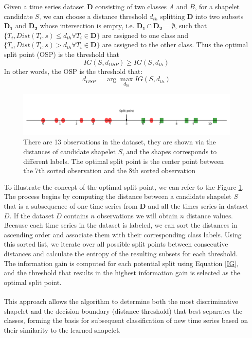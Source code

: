 \begin{definition}
Given a time series dataset $\boldsymbol{D}$ consisting of two classes $A$ and $B$, for a shapelet candidate $S$, we can choose a distance threshold $d_{th}$ splitting $\boldsymbol{D}$ into two subsets $\boldsymbol{D_1}$ and $\boldsymbol{D_2}$ whose intersection is empty, i.e. $\boldsymbol{D_1} \cap \boldsymbol{D_2}=\emptyset$, such that $\{T_i, Dist(T_i,s)\leq d_{th} \forall T_i \in \boldsymbol{D} \}$ are assigned to one class and $\{T_i, Dist(T_i,s) > d_{th} \forall T_i \in \boldsymbol{D} \}$ are assigned to the other class. Thus the optimal split point (OSP) is the threshold that 
$$
	IG(S, d_{OSP}) \geq IG(S, d_{th})
$$
In other words, the OSP is the threshold that:\\
$$
	d_{OSP}=\arg \max_{d_{th}} IG (S,d_{th})
$$
\label{def:OSP}
\end{definition}

\begin{figure}[h!]
	\centering
	\includegraphics[width=0.9\linewidth]{../Statistical_Sciences_template/figure/OSP.png}
	\caption{There are 13 observations in the dataset, they are shown via the distances of candidate shapelet $S$, and the shapes corresponds to different labels. The optimal split point is the center point between the 7th sorted observation and the 8th sorted observation}
	\label{fig:OSP}
\end{figure}

\noindent To illustrate the concept of the optimal split point, we can refer to the Figure \ref{fig:OSP}. The process begins by computing the distance between a candidate shapelet $S$ that is a subsequence of one time series from $\boldsymbol{D}$ and all the times series in dataset $D$. If the dataset $D$ contains $n$ observations we will obtain $n$ distance values. Because each time series in the dataset is labeled, we can sort the distances in ascending order and associate them with their corresponding class labels. Using this sorted list, we iterate over all possible split points between consecutive distances and calculate the entropy of the resulting subsets for each threshold. The information gain is computed for each potential split using Equation \eqref{IG}, and the threshold that results in the highest information gain is selected as the optimal split point.\\
\\
This approach allows the algorithm to determine both the most discriminative shapelet and the decision boundary (distance threshold) that best separates the classes, forming the basis for subsequent classification of new time series based on their similarity to the learned shapelet.\\
\\

